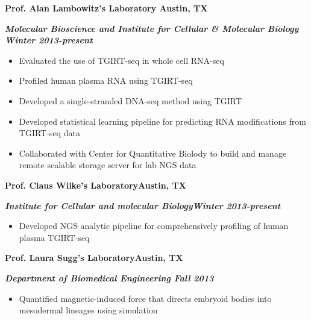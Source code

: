 \documentclass[dvips,11pt]{article}
\begin{document}
\noindent \centerline{\bf Prof. Alan Lambowitz's Laboratory \hfill	Austin, TX}
\noindent \centerline{\textit{\textbf{Molecular Bioscience and Institute for Cellular \& Molecular Biology  \hfill Winter 2013-present}}}
\vspace{-2mm}
\begin{itemize} \itemsep1pt \parskip0pt 
	\setlength{\itemsep}{0pt}
	\item Evaluated the use of TGIRT-seq in whole cell RNA-seq
	\item Profiled human plasma RNA using TGIRT-seq
	\item Developed a single-stranded DNA-seq method using TGIRT
	\item Developed statistical learning pipeline for predicting RNA modifications from TGIRT-seq data
	\item Collaborated with Center for Quantitative Biolody to build and manage remote scalable storage server for lab NGS data
\end{itemize}

\noindent \centerline{\bf Prof. Claus Wilke's Laboratory\hfill	Austin, TX}
\noindent \centerline{\textit {\textbf{Institute for Cellular and molecular Biology\hfill Winter 2013-present}}}
\vspace{-2mm}
\begin{itemize} \itemsep1pt \parskip0pt 
	\setlength{\itemsep}{0pt}
	\item Developed NGS analytic pipeline for comprehensively profiling of human plasma TGIRT-seq
\end{itemize}

\noindent \centerline{\bf Prof. Laura Sugg's Laboratory\hfill	Austin, TX}
\noindent \centerline{\textbf{\textit{Department of Biomedical Engineering \hfill Fall 2013}}}
\vspace{-2mm}
\begin{itemize} \itemsep1pt \parskip0pt 
	\setlength{\itemsep}{0pt}
	\item Quantified magnetic-induced force that directs embryoid bodies into mesodermal lineages using simulation
\end{itemize}
\end{document}
